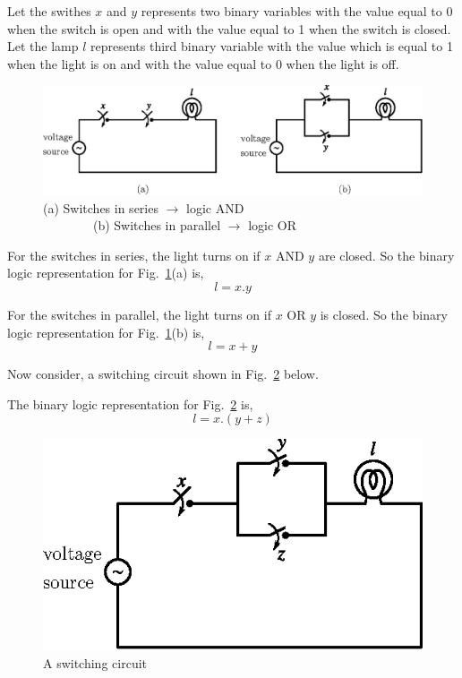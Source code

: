 Let the swithes $x$ and $y$ represents two binary variables with the value equal to 0 when the switch is open and with the value equal to 1 when the switch is closed. Let the lamp $l$ represents third binary variable with the value which is equal to 1 when the light is on and with the value equal to 0 when the light is off.
\begin{figure}[H]
\centering
\includegraphics{chap5/fig5.5.eps}
\caption{(a) Switches in series $\to$ logic AND\\ \qquad~~~~~~~~(b) Switches in parallel $\to$ logic OR}\label{fig5.5}
\end{figure}


For the switches in series, the light turns on if $x$ AND $y$ are closed. So the binary logic representation for Fig.~\ref{fig5.5}(a) is,
$$
l=x.y
$$

For the switches in parallel, the light turns on if $x$ OR $y$ is closed. So the binary logic representation for Fig.~\ref{fig5.5}(b) is,
$$
l=x+y
$$

Now consider, a switching circuit shown in Fig.~\ref{fig5.6} below.

The binary logic representation for Fig.~\ref{fig5.6} is,
$$
l=x.(y+z)
$$
\begin{figure}[H]
\centering
\includegraphics{chap5/fig5.6.eps}
\caption{A switching circuit}\label{fig5.6}
\end{figure}

